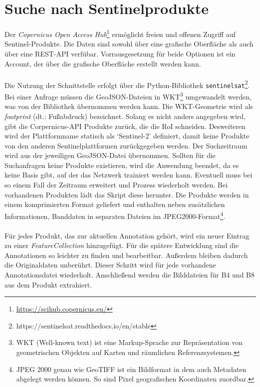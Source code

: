 \section{Suche nach Sentinelprodukte}


Der \textit{Copernicus Open Access Hub}\footnote{\url{https://scihub.copernicus.eu/}} ermöglicht freien und offenen Zugriff auf Sentinel-Produkte. Die Daten sind sowohl über eine grafische Oberfläche als auch über eine REST-API verfübar. Vorrausgesetzung für beide Optionen ist ein Account, der über die grafische Oberfläche erstellt werden kann.
\\\\
Die Nutzung der Schnittstelle erfolgt über die Python-Bibliothek \texttt{sentinelsat}\footnote{https://sentinelsat.readthedocs.io/en/stable}. Bei einer Anfrage müssen die GeoJSON-Dateien in WKT\footnote{WKT (Well-known text) ist eine Markup-Sprache zur Repräsentation von geometrischen Objekten auf Karten und räumlichen Referenzsystemen.} umgewandelt werden, was von der Bibliothek übernommen werden kann. Die WKT-Geometrie wird als \textit{footprint} (dt.: Fußabdruck) bezeichnet. Solang es nicht anders angegeben wird, gibt die Corpernicus-API Produkte zurück, die die RoI schneiden. Desweiteren wird der Plattformname statisch als `Sentinel-2' definiert, damit keine Produkte von den anderen Sentinelplattformen zurückgegeben werden. Der Suchzeitraum wird aus der jeweiligen GeoJSON-Datei übernommen. Sollten für die Suchanfragen keine Produkte existieren, wird die Anwendung beendet, da es keine Basis gibt, auf der das Netzwerk trainiert werden kann. Eventuell muss bei so einem Fall der Zeitraum erweitert und Prozess wiederholt werden. Bei vorhandenen Produkten lädt das Skript diese herunter. Die Produkte werden in einem komprimierten Format geliefert und enthalten neben zusätzlichen Informationen, Banddaten in separaten Dateien im JPEG2000-Format\footnote{JPEG 2000 genau wie GeoTIFF ist ein Bildformat in dem auch Metadaten abgelegt werden können. So sind Pixel geografischen Koordinaten zuordbar.}.
\\\\
Für jedes Produkt, das zur aktuellen Annotation gehört, wird ein neuer Eintrag zu einer \textit{FeatureCollection} hinzugefügt. Für die spätere Entwicklung sind die Annotationen so leichter zu finden und bearbeitbar. Außerdem bleiben dadurch die Originaldaten unberührt. Dieser Schritt wird für jede vorhandene Annotationsdatei wiederholt. Anschließend werden die Bilddateien für B4 und B8 aus dem Produkt extrahiert.

